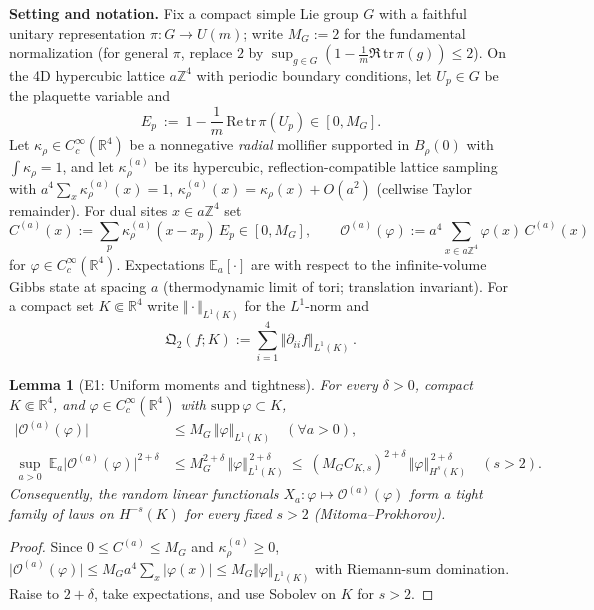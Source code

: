 \documentclass[11pt]{amsart}
\theoremstyle{plain}
\newtheorem{lemma}[theorem]{Lemma}
\theoremstyle{definition}
\theoremstyle{remark}
\renewcommand{\tfrac}[2]{\textstyle\frac{#1}{#2}}
\begin{document}
\noindent\textbf{Setting and notation.}
Fix a compact simple Lie group $G$ with a faithful unitary representation $\pi:G\to U(m)$; write $M_G:=2$ for the fundamental normalization (for general $\pi$, replace $2$ by $\sup_{g\in G}(1-\tfrac1m\Re\,\mathrm{tr}\,\pi(g))\le 2$). On the 4D hypercubic lattice $a\mathbb Z^4$ with periodic boundary conditions, let $U_p\in G$ be the plaquette variable and
\[
E_p\ :=\ 1-\tfrac{1}{m}\,\mathrm{Re}\,\mathrm{tr}\,\pi(U_p)\in[0,M_G].
\]
Let $\kappa_\rho\in C_c^\infty(\mathbb R^4)$ be a nonnegative \emph{radial} mollifier supported in $B_\rho(0)$ with $\int\kappa_\rho=1$, and let $\kappa_\rho^{(a)}$ be its hypercubic, reflection-compatible lattice sampling with $a^4\sum_x\kappa_\rho^{(a)}(x)=1$, $\kappa_\rho^{(a)}(x)=\kappa_\rho(x)+O(a^2)$ (cellwise Taylor remainder). For dual sites $x\in a\mathbb Z^4$ set
\[
C^{(a)}(x):=\sum_{p}\kappa_\rho^{(a)}(x-x_p)\,E_p\in[0,M_G],\qquad \mathcal O^{(a)}(\varphi):=a^4\sum_{x\in a\mathbb Z^4}\varphi(x)\,C^{(a)}(x)
\]
for $\varphi\in C_c^\infty(\mathbb R^4)$. Expectations $\mathbb E_a[\cdot]$ are with respect to the infinite-volume Gibbs state at spacing $a$ (thermodynamic limit of tori; translation invariant). For a compact set $K\Subset\mathbb R^4$ write $\Vert\cdot\Vert_{L^1(K)}$ for the $L^1$-norm and
\[
\mathfrak Q_2(f;K):=\sum_{i=1}^4\Vert\partial_{ii}f\Vert_{L^1(K)}\,.
\]

\begin{lemma}[E1: Uniform moments and tightness]\label{lem:E1-tightness}
For every $\delta>0$, compact $K\Subset\mathbb R^4$, and $\varphi\in C_c^\infty(\mathbb R^4)$ with $\mathrm{supp}\,\varphi\subset K$,
\begin{align}
\big|\mathcal O^{(a)}(\varphi)\big|&\le M_G\,\Vert\varphi\Vert_{L^1(K)}\quad(\forall a>0),\\
\sup_{a>0}\ \mathbb E_a\big|\mathcal O^{(a)}(\varphi)\big|^{2+\delta}&\le M_G^{2+\delta}\,\Vert\varphi\Vert_{L^1(K)}^{\,2+\delta}
\ \le\ (M_G C_{K,s})^{2+\delta}\,\Vert\varphi\Vert_{H^s(K)}^{\,2+\delta}\quad(s>2).
\end{align}
Consequently, the random linear functionals $X_a:\varphi\mapsto\mathcal O^{(a)}(\varphi)$ form a tight family of laws on $H^{-s}(K)$ for every fixed $s>2$ (Mitoma--Prokhorov).
\end{lemma}
\begin{proof}
Since $0\le C^{(a)}\le M_G$ and $\kappa^{(a)}_\rho\ge 0$, $\big|\mathcal O^{(a)}(\varphi)\big|\le M_G a^4\sum_x|\varphi(x)|\le M_G\Vert\varphi\Vert_{L^1(K)}$ with Riemann-sum domination. Raise to $2+\delta$, take expectations, and use Sobolev on $K$ for $s>2$.
\end{proof}
\end{document}
